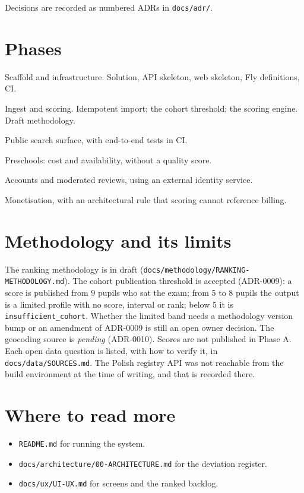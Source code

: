 \documentclass[11pt,a4paper]{article}
\begin{document}
Decisions are recorded as numbered ADRs in \texttt{docs/adr/}.

\section{Phases}

\begin{description}[leftmargin=*,style=nextline]
  \item[A] Scaffold and infrastructure. Solution, API skeleton, web skeleton, Fly definitions, CI.
  \item[B] Ingest and scoring. Idempotent import; the cohort threshold; the scoring engine. Draft methodology.
  \item[C] Public search surface, with end-to-end tests in CI.
  \item[D] Preschools: cost and availability, without a quality score.
  \item[E] Accounts and moderated reviews, using an external identity service.
  \item[F] Monetisation, with an architectural rule that scoring cannot reference billing.
\end{description}

\section{Methodology and its limits}

The ranking methodology is in draft (\texttt{docs/methodology/RANKING-METHODOLOGY.md}). The cohort
publication threshold is accepted (ADR-0009): a score is published from 9 pupils who sat the exam; from 5 to 8
pupils the output is a limited profile with no score, interval or rank; below 5 it is \texttt{insufficient\_cohort}.
Whether the limited band needs a methodology version bump or an amendment of ADR-0009 is still an open owner decision.
The geocoding source is
\emph{pending} (ADR-0010). Scores are not published in Phase A. Each open data question is listed,
with how to verify it, in \texttt{docs/data/SOURCES.md}. The Polish registry API was not reachable
from the build environment at the time of writing, and that is recorded there.

\section{Where to read more}

\begin{itemize}[leftmargin=*]
  \item \texttt{README.md} for running the system.
  \item \texttt{docs/architecture/00-ARCHITECTURE.md} for the deviation register.
  \item \texttt{docs/ux/UI-UX.md} for screens and the ranked backlog.
\end{itemize}
\end{document}
